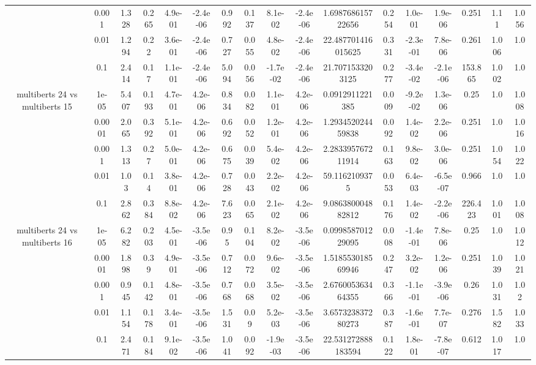 \begin{tabular}{|c|c|c|c|c|c|c|c|c|c|c|c|c|c|c|c|c|}
 & 0.001 & 1.328 & 0.265 & 4.9e-01 & -2.4e-06 & 0.992 & 0.137 & 8.1e-02 & -2.4e-06 & 1.698768615722656 & 0.254 & 1.0e-01 & 1.9e-06 & 0.251 & 1.11 & 1.056 \\
 & 0.01 & 1.294 & 0.22 & 3.6e-01 & -2.4e-06 & 0.727 & 0.055 & 4.8e-02 & -2.4e-06 & 22.487701416015625 & 0.331 & -2.3e-01 & 7.8e-06 & 0.261 & 1.006 & 1.0 \\
 & 0.1 & 2.414 & 0.17 & 1.1e-01 & -2.4e-06 & 5.094 & 0.056 & -1.7e-02 & -2.4e-06 & 21.7071533203125 & 0.277 & -3.4e-02 & -2.1e-06 & 153.865 & 1.002 & 1.0 \\
\hline
\multirow{5}{*}{multiberts 24 vs multiberts 15} & 1e-05 & 5.407 & 0.193 & 4.7e-01 & 4.2e-06 & 0.834 & 0.082 & 1.1e-01 & 4.2e-06 & 0.0912911221385 & 0.009 & -9.2e-02 & 1.3e-06 & 0.25 & 1.0 & 1.008 \\
 & 0.0001 & 2.065 & 0.392 & 5.1e-01 & 4.2e-06 & 0.692 & 0.052 & 1.2e-01 & 4.2e-06 & 1.293452024459838 & 0.092 & 1.4e-02 & 2.2e-06 & 0.251 & 1.0 & 1.016 \\
 & 0.001 & 1.313 & 0.27 & 5.0e-01 & 4.2e-06 & 0.675 & 0.039 & 5.4e-02 & 4.2e-06 & 2.283395767211914 & 0.163 & 9.8e-02 & 3.0e-06 & 0.251 & 1.054 & 1.022 \\
 & 0.01 & 1.03 & 0.14 & 3.8e-01 & 4.2e-06 & 0.728 & 0.043 & 2.2e-02 & 4.2e-06 & 59.1162109375 & 0.053 & 6.4e-03 & -6.5e-07 & 0.966 & 1.0 & 1.0 \\
 & 0.1 & 2.862 & 0.384 & 8.8e-02 & 4.2e-06 & 7.623 & 0.065 & 2.1e-02 & 4.2e-06 & 9.086380004882812 & 0.176 & 1.4e-02 & -2.2e-06 & 226.423 & 1.001 & 1.008 \\
\hline
\multirow{5}{*}{multiberts 24 vs multiberts 16} & 1e-05 & 6.282 & 0.203 & 4.5e-01 & -3.5e-06 & 0.95 & 0.104 & 8.2e-02 & -3.5e-06 & 0.099858701229095 & 0.008 & -1.4e-01 & 7.8e-06 & 0.25 & 1.0 & 1.012 \\
 & 0.0001 & 1.898 & 0.39 & 4.9e-01 & -3.5e-06 & 0.712 & 0.072 & 9.6e-02 & -3.5e-06 & 1.518553018569946 & 0.247 & 3.2e-02 & 1.2e-06 & 0.251 & 1.039 & 1.021 \\
 & 0.001 & 0.945 & 0.142 & 4.8e-01 & -3.5e-06 & 0.768 & 0.068 & 3.5e-02 & -3.5e-06 & 2.676005363464355 & 0.366 & -1.1e-01 & -3.9e-06 & 0.26 & 1.031 & 1.02 \\
 & 0.01 & 1.154 & 0.178 & 3.4e-01 & -3.5e-06 & 1.531 & 0.09 & 5.2e-03 & -3.5e-06 & 3.657323837280273 & 0.387 & -1.6e-01 & 7.7e-07 & 0.276 & 1.582 & 1.033 \\
 & 0.1 & 2.471 & 0.184 & 9.1e-02 & -3.5e-06 & 1.041 & 0.092 & -1.9e-03 & -3.5e-06 & 22.531272888183594 & 0.122 & 1.8e-01 & -7.8e-07 & 0.612 & 1.017 & 1.0 \\

\end{tabular}
